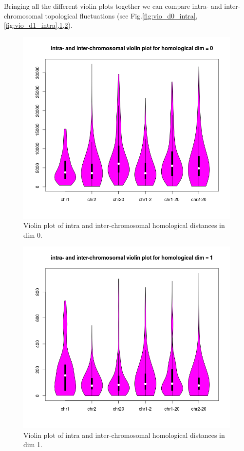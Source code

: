 \documentclass[12pt,a4paper]{article}
\begin{document}
Bringing all the different violin plots together we can compare intra- and inter-chromosomal topological fluctuations (see Fig.\ref{fig:vio_d0_intra},\ref{fig:vio_d1_intra},\ref{fig:vio_d0_inter},\ref{fig:vio_d1_inter}).
\begin{figure}[hbtp]
\centering
\includegraphics[scale=0.75]{fluct_dim0.png}
\caption{Violin plot of intra and inter-chromosomal homological distances in dim 0.}
\label{fig:vio_d0_inter}
\end{figure}
\begin{figure}[hbtp]
\centering
\includegraphics[scale=0.75]{fluct_dim1.png}
\caption{Violin plot of intra and inter-chromosomal homological distances in dim 1.}
\label{fig:vio_d1_inter}
\end{figure}
\end{document}
